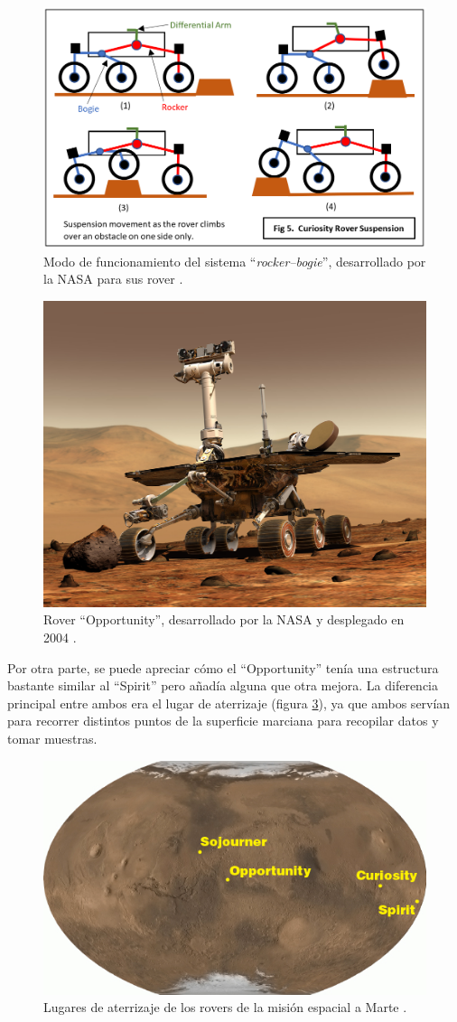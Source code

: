 \begin{figure}[H]
    \centering
    \includegraphics[width=.6\linewidth]{pictures/curiosity_suspension.png}
    \caption{Modo de funcionamiento del sistema ``\textit{rocker--bogie}'', 
    desarrollado por la NASA para sus rover \cite{billmarshallGiveYourRobot2018}.}
    \label{fig:rb-system}
\end{figure}

\begin{figure}[H]
    \centering
    \includegraphics[width=.5\linewidth]{pictures/opportunity.jpg}
    \caption{Rover ``Opportunity'', desarrollado por la NASA y desplegado en 2004 \cite{OpportunityRover2020a}.}
    \label{fig:opportunity}
\end{figure}

Por otra parte, se puede apreciar cómo el ``Opportunity'' tenía una estructura bastante
similar al ``Spirit'' pero añadía alguna que otra mejora. La diferencia principal entre ambos 
era el lugar de aterrizaje (figura \ref{fig:landing_sites}), ya que ambos servían para 
recorrer distintos puntos de la superficie marciana para recopilar datos y tomar muestras.

\begin{figure}[H]
    \centering
    \includegraphics[width=.75\linewidth]{pictures/rover-landing-sites.en.jpg}
    \caption{Lugares de aterrizaje de los rovers de la misión espacial a Marte \cite{MarsRoversSpirita}.}
    \label{fig:landing_sites}
\end{figure}

